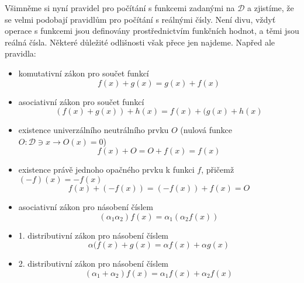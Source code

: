       Všimněme si nyní pravidel pro počítání s funkcemi zadanými na \(\mathcal{D}\) a zjistíme, 
      že se velmi podobají pravidlům pro počítání s reálnými čísly. Není divu, vždyť operace s 
      funkcemi jsou definovány prostřednictvím funkčních hodnot, a těmi jsou reálná čísla. Některé 
      důležité odlišnosti však přece jen najdeme. Napřed ale pravidla:
      
      \begin{itemize}\addtolength{\itemsep}{-0.5\baselineskip}
        \item komutativní zákon pro součet funkcí
          \begin{equation}\label{mai:eq012}
            f(x) + g(x) = g(x) + f(x)
          \end{equation}
        \item asociativní zákon pro součet funkcí  
          \begin{equation}\label{mai:eq013}
            (f(x) + g(x)) + h(x) = f(x) + (g(x) + h(x)
          \end{equation}
        \item existence univerzálního neutrálního  prvku \(O\) (nulová funkce \(O:\mathcal{D}\ni x 
          \rightarrow O(x)=0\))
          \begin{equation}\label{mai:eq014}
            f(x) + O = O + f(x) = f(x)
          \end{equation}
        \item existence právě jednoho opačného prvku k funkci \(f\), přičemž \((-f)(x) = -f(x)\)
          \begin{equation}\label{mai:eq015}
            f(x)+(-f(x))=(-f(x))+f(x)=O
          \end{equation}
        \item asociativní zákon pro násobení číslem 
         \begin{equation}\label{mai:eq016}
            (\alpha_1\alpha_2)f(x) = \alpha_1(\alpha_2f(x))
         \end{equation}
        \item  1. distributivní zákon pro násobení číslem
          \begin{equation}\label{mai:eq017}
            \alpha(f(x)+g(x) =\alpha f(x) + \alpha g(x)
          \end{equation}\label{mai:eq018}
        \item 2. distributivní zákon pro násobení číslem 
          \begin{equation}\label{mai:eq019}
            (\alpha_1+\alpha_2)f(x) =\alpha_1f(x)+\alpha_2f(x)

\end{equation}
\end{itemize}
